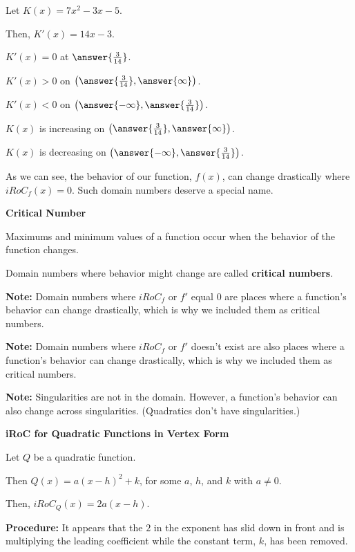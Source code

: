 \documentclass{ximera}
\begin{document}
\begin{question} 



Let $K(x) = 7 x^2 - 3 x - 5$.

Then, $K'(x) = 14 x - 3$.

$K'(x) = 0$ at $\answer{\frac{3}{14}}$.

$K'(x) > 0$ on $\left( \answer{\frac{3}{14}} , \answer{\infty} \right)$.

$K'(x) < 0$ on $\left( \answer{-\infty}, \answer{\frac{3}{14}} \right)$.

$K(x)$ is increasing on $\left( \answer{\frac{3}{14}} , \answer{\infty} \right)$.

$K(x)$ is decreasing on $\left( \answer{-\infty}, \answer{\frac{3}{14}} \right)$.

\end{question}








As we can see, the behavior of our function, $f(x)$, can change drastically where $iRoC_f(x) = 0$.  Such domain numbers deserve a special name.



\begin{idea} \textbf{\textcolor{blue!55!black}{Critical Number}}  


Maximums and minimum values of a function occur when the behavior of the function changes.

Domain numbers where behavior might change are called \textbf{critical numbers}.


\end{idea}


\textbf{Note: } Domain numbers where $iRoC_f$ or $f'$ equal $0$ are places where a function's behavior can change drastically, which is why we included them as critical numbers.

\textbf{Note: } Domain numbers where $iRoC_f$ or $f'$ doesn't exist are also places where a function's behavior can change drastically, which is why we included them as critical numbers.

\textbf{Note: } Singularities are not in the domain. However, a function's behavior can also change across singularities. (Quadratics don't have singularities.)


\begin{procedure} \textbf{\textcolor{purple!30!blue}{iRoC for Quadratic Functions in Vertex Form}} 



Let $Q$ be a quadratic function.

Then $Q(x) = a (x - h)^2 + k$, for some $a$, $h$, and $k$ with $a \ne 0$. 

Then, $iRoC_Q(x) = 2 a (x - h)$. 


\textbf{Procedure:} It appears that the $2$ in the exponent has slid down in front and is multiplying the leading coefficient while the constant term, $k$, has been removed.



\end{procedure}
\end{document}
